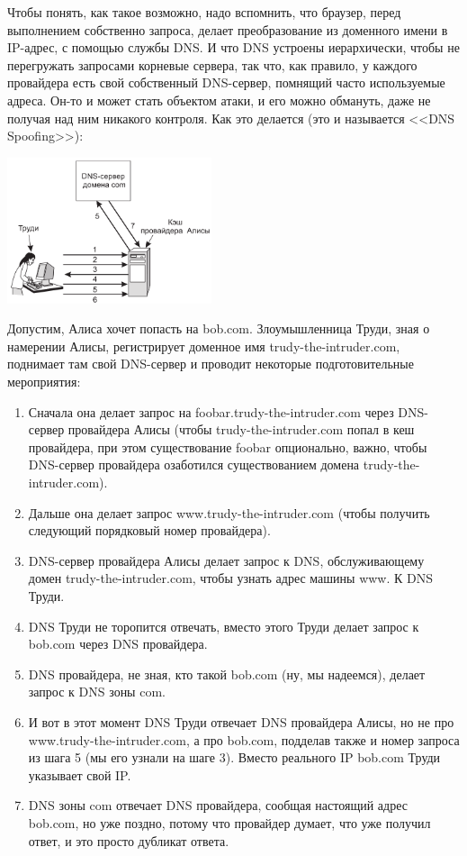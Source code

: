 \documentclass{../mcstext}
\begin{document}
Чтобы понять, как такое возможно, надо вспомнить, что браузер, перед выполнением собственно запроса, делает преобразование из доменного имени в IP-адрес, с помощью службы DNS. И что DNS устроены иерархически, чтобы не перегружать запросами корневые сервера, так что, как правило, у каждого провайдера есть свой собственный DNS-сервер, помнящий часто используемые адреса. Он-то и может стать объектом атаки, и его можно обмануть, даже не получая над ним никакого контроля. Как это делается (это и называется <<DNS Spoofing>>):

\begin{center}
    \includegraphics[width=0.45\textwidth]{dnsSpoofing.png}
\end{center}

Допустим, Алиса хочет попасть на bob.com. Злоумышленница Труди, зная о намерении Алисы, регистрирует доменное имя trudy-the-intruder.com, поднимает там свой DNS-сервер и проводит некоторые подготовительные мероприятия: 

\begin{enumerate}
    \item Сначала она делает запрос на foobar.trudy-the-intruder.com через DNS-сервер провайдера Алисы (чтобы trudy-the-intruder.com попал в кеш провайдера, при этом существование foobar опционально, важно, чтобы DNS-сервер провайдера озаботился существованием домена trudy-the-intruder.com).
    \item Дальше она делает запрос www.trudy-the-intruder.com (чтобы получить следующий порядковый номер провайдера).
    \item DNS-сервер провайдера Алисы делает запрос к DNS, обслуживающему домен trudy-the-intruder.com, чтобы узнать адрес машины www. К DNS Труди.
    \item DNS Труди не торопится отвечать, вместо этого Труди делает запрос к bob.com через DNS провайдера.
    \item DNS провайдера, не зная, кто такой bob.com (ну, мы надеемся), делает запрос к DNS зоны com.
    \item И вот в этот момент DNS Труди отвечает DNS провайдера Алисы, но не про www.trudy-the-intruder.com, а про bob.com, подделав также и номер запроса из шага 5 (мы его узнали на шаге 3). Вместо реального IP bob.com Труди указывает свой IP.
    \item DNS зоны com отвечает DNS провайдера, сообщая настоящий адрес bob.com, но уже поздно, потому что провайдер думает, что уже получил ответ, и это просто дубликат ответа.
\end{enumerate}
\end{document}

